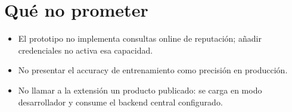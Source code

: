 \documentclass[11pt,a4paper]{article}
\begin{document}
\section{Qué no prometer}

\begin{itemize}
  \item El prototipo no implementa consultas online de reputación; añadir credenciales no activa esa capacidad.
  \item No presentar el accuracy de entrenamiento como precisión en producción.
  \item No llamar a la extensión un producto publicado: se carga en modo desarrollador y consume el backend central configurado.
\end{itemize}
\end{document}
